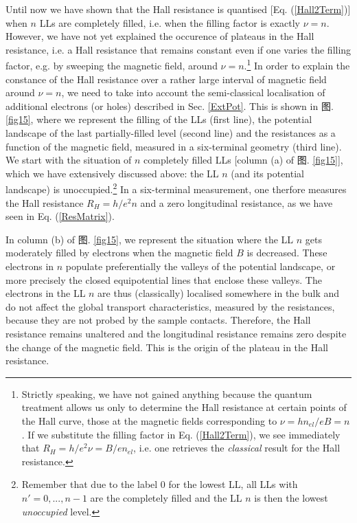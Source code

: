 \documentclass[10pt]{book}
\begin{document}
Until now we have shown that the Hall resistance is quantised [Eq. (\ref{Hall2Term})] when $n$ LLs are completely filled, i.e. 
when the filling factor is exactly $\nu=n$. However, we have not yet explained the occurence of plateaus in the Hall 
resistance, i.e. a Hall resistance that remains constant even if one varies the filling factor, 
e.g. by sweeping the magnetic field, around $\nu=n$.\footnote{Strictly speaking,
we have not gained anything because the quantum treatment allows us only to determine the Hall resistance at certain
points of the Hall curve, those at the magnetic fields corresponding to $\nu=hn_{el}/eB = n$. If we substitute the filling
factor in Eq. (\ref{Hall2Term}), we see immediately that $R_H=h/e^2\nu= B/en_{el}$, i.e. one retrieves the {\sl classical} 
result for the Hall resistance.}
In order to explain the constance of the Hall resistance over a rather large interval of magnetic field around $\nu=n$,
we need to take into account the semi-classical localisation of additional electrons (or holes) described in Sec. \ref{ExtPot}.
This is shown in 图. \ref{fig15}, where we represent the filling of the LLs
(first line), the potential landscape of the last partially-filled
level (second line) and the resistances as a function of the magnetic field, measured in a six-terminal geometry (third line).
We start with the situation of $n$ completely filled LLs [column (a) of 图. \ref{fig15}], 
which we have extensively discussed above: the LL $n$ (and its potential landscape) is unoccupied.\footnote{Remember
that due to the label $0$ for the lowest LL, all LLs with $n'=0, ..., n-1$ are the completely filled and the LL $n$ is then
the lowest {\sl unoccupied} level.}
In a six-terminal measurement, one therfore measures the Hall
resistance $R_H=h/e^2 n$ and a zero longitudinal resistance, as we have seen in Eq. (\ref{ResMatrix}). 

In column (b) of
图. \ref{fig15}, we represent the situation where the LL $n$ gets moderately filled by electrons when 
the magnetic field $B$ is decreased.
These electrons in $n$ populate preferentially the valleys of the potential landscape, or more precisely the closed equipotential
lines that enclose these valleys. The electrons in the LL $n$ are thus (classically) localised somewhere in the 
bulk and do not affect the global transport characteristics, measured by the resistances, 
because they are not probed by the sample contacts. Therefore, the Hall resistance remains unaltered and the longitudinal resistance
remains zero despite the change of the magnetic field. This is the origin of the plateau in the Hall resistance. 
\end{document}
